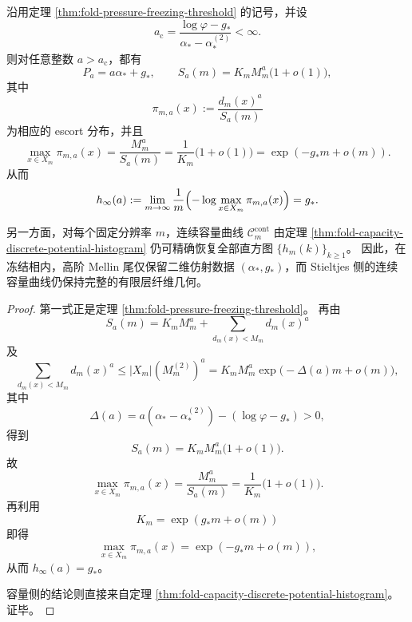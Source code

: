 \begin{theorem}\label{thm:fold-frozen-mellin-stieltjes-bifurcation}
沿用定理 \ref{thm:fold-pressure-freezing-threshold} 的记号，并设
\[
a_{\mathrm c}=\frac{\log\varphi-g_*}{\alpha_*-\alpha_*^{(2)}}<\infty.
\]
则对任意整数 \(a>a_{\mathrm c}\)，都有
\[
P_a=a\alpha_*+g_*,
\qquad
S_a(m)=K_mM_m^a\bigl(1+o(1)\bigr),
\]
其中
\[
\pi_{m,a}(x):=\frac{d_m(x)^a}{S_a(m)}
\]
为相应的 escort 分布，并且
\[
\max_{x\in X_m}\pi_{m,a}(x)
=\frac{M_m^a}{S_a(m)}
=\frac{1}{K_m}\bigl(1+o(1)\bigr)
=\exp(-g_*m+o(m)).
\]
从而
\[
h_\infty(a):=\lim_{m\to\infty}\frac{1}{m}
\Bigl(-\log\max_{x\in X_m}\pi_{m,a}(x)\Bigr)=g_*.
\]

另一方面，对每个固定分辨率 \(m\)，连续容量曲线 \(\mathcal C_m^{\mathrm{cont}}\) 由定理 \ref{thm:fold-capacity-discrete-potential-histogram} 仍可精确恢复全部直方图 \(\{h_m(k)\}_{k\ge 1}\)。
因此，在冻结相内，高阶 Mellin 尾仅保留二维仿射数据 \((\alpha_*,g_*)\)，而 Stieltjes 侧的连续容量曲线仍保持完整的有限层纤维几何。
\end{theorem}
\begin{proof}
第一式正是定理 \ref{thm:fold-pressure-freezing-threshold}。
再由
\[
S_a(m)=K_mM_m^a+\sum_{d_m(x)<M_m}d_m(x)^a
\]
及
\[
\sum_{d_m(x)<M_m}d_m(x)^a
\le |X_m|(M_m^{(2)})^a
=K_mM_m^a\exp\!\bigl(-\Delta(a)m+o(m)\bigr),
\]
其中
\[
\Delta(a)=a(\alpha_*-\alpha_*^{(2)})-(\log\varphi-g_*)>0,
\]
得到
\[
S_a(m)=K_mM_m^a\bigl(1+o(1)\bigr).
\]
故
\[
\max_{x\in X_m}\pi_{m,a}(x)=\frac{M_m^a}{S_a(m)}=\frac{1}{K_m}\bigl(1+o(1)\bigr).
\]
再利用
\[
K_m=\exp(g_*m+o(m))
\]
即得
\[
\max_{x\in X_m}\pi_{m,a}(x)=\exp(-g_*m+o(m)),
\]
从而 \(h_\infty(a)=g_*\)。

容量侧的结论则直接来自定理 \ref{thm:fold-capacity-discrete-potential-histogram}。证毕。
\end{proof}

